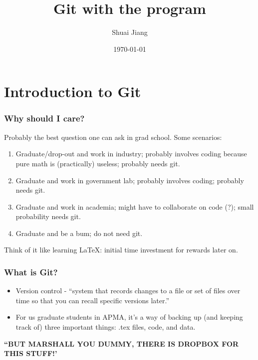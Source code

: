 \documentclass{beamer}
\title{Git with the program}
\date{\today}
\author{Shuai Jiang}
\institute{Brown University}
\begin{document}


\maketitle

\section{Introduction to Git}
\begin{frame}
	\frametitle{Why should I care?}

	\pause

	Probably the best question one can ask in grad school. 
	Some scenarios: \pause 
	\begin{enumerate}
		\item Graduate/drop-out and work in industry; probably involves coding because pure math is (practically) useless; \pause probably needs git. \pause
		\item Graduate and work in government lab; probably involves coding; \pause probably needs git.\pause
		\item Graduate and work in academia; might have to collaborate on code (?); \pause small probability needs git.\pause
		\item Graduate and be a bum; do not need git. \pause 
	\end{enumerate}
	Think of it like learning \LaTeX: initial time investment for rewards later on. 
\end{frame}

\begin{frame}
	\frametitle{What is Git?}
	\begin{itemize}
		\item Version control - ``system that records changes to a file or set of files over time so that you can recall specific versions later.'' \pause 
		\item For us graduate students in APMA, it's a way of backing up (and keeping track of) three important things:  .tex files,  code,  and data. \pause
	\end{itemize}
	\textbf{``BUT MARSHALL YOU DUMMY, THERE IS DROPBOX FOR THIS STUFF!'}
\end{frame}
\end{document}
